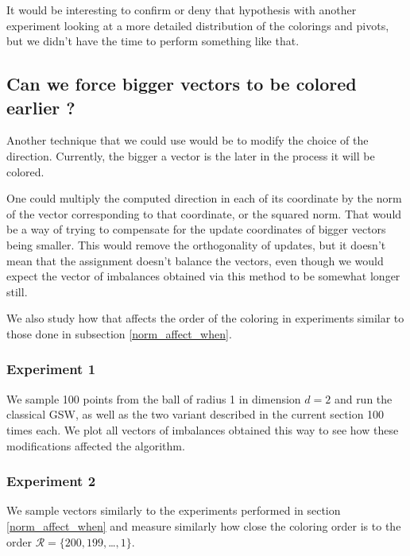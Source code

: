 \documentclass[12pt]{article}
\begin{document}
It would be interesting to confirm or deny that hypothesis with another experiment looking at a more detailed distribution of the colorings and pivots, but we didn't have the time to perform something like that.

\subsection{Can we force bigger vectors to be colored earlier ?}\label{bigger_earlier}
Another technique that we could use would be to modify the choice of the direction. Currently, the bigger a vector is the later in the process it will be colored. 

One could multiply the computed direction in each of its coordinate by the norm of the vector corresponding to that coordinate, or the squared norm. That would be a way of trying to compensate for the update coordinates of bigger vectors being smaller. This would remove the orthogonality of updates, but it doesn't mean that the assignment doesn't balance the vectors, even though we would expect the vector of imbalances obtained via this method to be somewhat longer still.

We also study how that affects the order of the coloring in experiments similar to those done in subsection \ref{norm_affect_when}.
\subsubsection{Experiment 1}\label{bigger_earlier_exp1}
We sample 100 points from the ball of radius 1 in dimension $d=2$ and run the classical GSW, as well as the two variant described in the current section 100 times each. We plot all vectors of imbalances obtained this way to see how these modifications affected the algorithm.
\subsubsection{Experiment 2}\label{bigger_earlier_exp2}
We sample vectors similarly to the experiments performed in section \ref{norm_affect_when} and measure similarly how close the coloring order is to the order $\mathcal{R}=\{200,199,$\dots$,1\}$.
\end{document}
